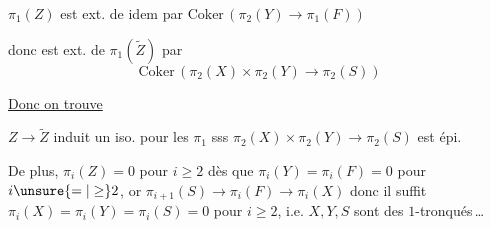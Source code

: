 $\pi_1(Z)$ est ext. de idem par $\mathrm{Coker}\,(\pi_2(Y)\to\pi_1(F))$

donc est ext. de $\pi_1(\widetilde Z)$ par
\[
\mathrm{Coker}\,(\pi_2(X)\times\pi_2(Y)\to\pi_2(S))
\]

\uline{Donc on trouve}

$Z\longrightarrow\widetilde Z$ induit un iso. pour les $\pi_1$ sss $\pi_2(X)\times\pi_2(Y)\longrightarrow\pi_2(S)$ est épi.

De plus, $\pi_i(Z)=0$ pour $i\geq 2$  dès que $\pi_i(Y)=\pi_i(F)=0$ pour $i\unsure{=|\geq}2$, or $\pi_{i+1}(S)\to\pi_i(F)\to\pi_i(X)$ donc il suffit $\pi_i(X)=\pi_i(Y)=\pi_i(S)=0$ pour $i\geq 2$, i.e. $X,Y,S$ sont des $1$-tronqués\,\ldots
